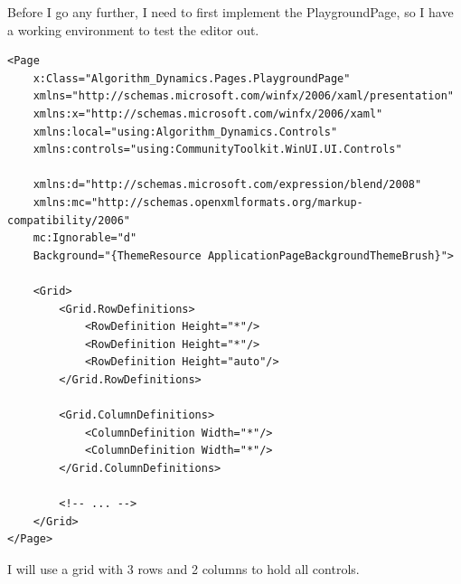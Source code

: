 \documentclass[a4paper]{report}
\begin{document}
Before I go any further, I need to first implement the PlaygroundPage, so I have a working environment to test the editor out.

\begin{verbatim}
<Page
    x:Class="Algorithm_Dynamics.Pages.PlaygroundPage"
    xmlns="http://schemas.microsoft.com/winfx/2006/xaml/presentation"
    xmlns:x="http://schemas.microsoft.com/winfx/2006/xaml"
    xmlns:local="using:Algorithm_Dynamics.Controls"
    xmlns:controls="using:CommunityToolkit.WinUI.UI.Controls"

    xmlns:d="http://schemas.microsoft.com/expression/blend/2008"
    xmlns:mc="http://schemas.openxmlformats.org/markup-compatibility/2006"
    mc:Ignorable="d"
    Background="{ThemeResource ApplicationPageBackgroundThemeBrush}">

    <Grid>
        <Grid.RowDefinitions>
            <RowDefinition Height="*"/>
            <RowDefinition Height="*"/>
            <RowDefinition Height="auto"/>
        </Grid.RowDefinitions>

        <Grid.ColumnDefinitions>
            <ColumnDefinition Width="*"/>
            <ColumnDefinition Width="*"/>
        </Grid.ColumnDefinitions>

        <!-- ... -->
    </Grid> 
</Page>
\end{verbatim}

I will use a grid with 3 rows and 2 columns to hold all controls.
\end{document}
